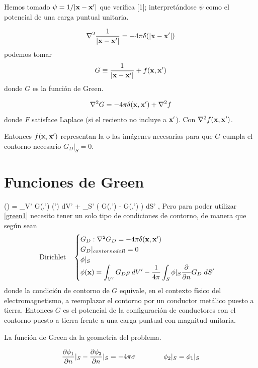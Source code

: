 \documentclass[10pt,oneside]{CBFT_book}
\begin{document}
Hemos tomado $\psi=1/|\vb{x}-\vb{x}'|$ que verifica [1]; interpretándose $\psi$ como el potencial
de una carga puntual unitaria.

\[
	\lapm{\frac{1}{|\vb{x}-\vb{x}'|}} = - 4\pi \delta( |\vb{x}-\vb{x}'| )
\]
podemos tomar
\[
	G \equiv \frac{1}{|\vb{x}-\vb{x}'|} + f( \vb{x}, \vb{x}')
\]
donde $G$ es la función de Green.

\[
	\lapm{G} = -4\pi  \delta( \vb{x}, \vb{x}' ) + \lapm{f}
\]
donde $F$ satisface Laplace (si el reciento no incluye a $\vb{x}'$).
Con $\lapm{f( \vb{x}, \vb{x}' )}$.

Entonces $f( \vb{x}, \vb{x}' )$ representan la o las imágenes necesarias para que
$G$ cumpla el contorno necesario $G_D|_S=0$.


\section{Funciones de Green}

\be
	\phi() = \int_{V'} G(,') \rho(')  \; dV' +
	 \int_{S'} \left( G(,') -\phi{} G(,') \right)\; dS' ,
	\label{green1}
\ee
Pero para poder utilizar \eqref{green1} necesito tener un solo tipo de condiciones de contorno,
de manera que según sean
\[
	\textrm{Dirichlet} \quad 	\begin{cases}
				G_D : \lapm{G_D} = -4\pi \delta(\vb{x},\vb{x}') \\
				G_D |_{contorno de R} = 0  \\
				\phi|_S \\
				\phi(\vb{x}) = \displaystyle \int_{V'} G_D \rho \; dV' - \frac{1}{4\pi}
				\int_{S} \phi|_S\frac{\partial}{\partial n} G_D \; dS'
			\end{cases}
\]
donde la condición de contorno de $G$ equivale, en el contexto físico del electromagnetismo, a
reemplazar el contorno por un conductor metálico puesto a tierra.
Entonces $G$ es el potencial de la configuración de conductores con el contorno puesto a tierra
frente a una carga puntual con magnitud unitaria.

La función de Green da la geometría del problema.

\[
	\frac{\partial^{\hspace{-0.05em}} {\phi_1}}{\partial {n}^{\hspace{-0.05em}}}|_S - \frac{\partial^{\hspace{-0.05em}} {\phi_2}}{\partial {n}^{\hspace{-0.05em}}}|_S = -4\pi\sigma \qquad \qquad \phi_2|_S = \phi_1|_S
\]
\end{document}

